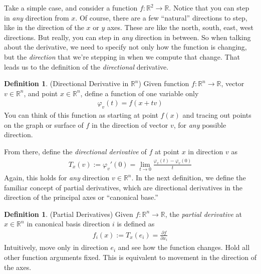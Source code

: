 \documentclass[12pt]{book}
\numberwithin{equation}{section} %
\theoremstyle{plain}
\theoremstyle{definition}
\newtheorem{defn}[thm]{Definition}
\theoremstyle{remark}
\newcommand{\R}{\mathbb{R}}
\newcommand{\Rn}{\mathbb{R}^n}
\begin{document}
Take a simple case, and consider a function $f:\R^2\rightarrow \R$.
Notice that you can step in \emph{any} direction from $x$. Of course,
there are a few ``natural'' directions to step, like in the direction of
the $x$ or $y$ axes. These are like the north, south, east, west
directions. But really, you can step in \emph{any} direction in between.
So when talking about the derivative, we need to specify not only how
the function is changing, but the \emph{direction} that we're stepping
in when we compute that change. That leads us to the definition of the
\emph{directional} derivative.
\begin{figure}[htpb!]
\centering
{}
\end{figure}

\begin{defn}{(Directional Derivative in $\Rn$)}
Given function $f:\Rn\rightarrow\R$, vector $v\in\Rn$, and point $x\in
\Rn$, define a function of one variable only
\begin{align*}
  \varphi_v(t) = f(x+tv)
\end{align*}
You can think of this function as starting at point $f(x)$ and tracing
out points on the graph or surface of $f$ in the direction of vector
$v$, for \emph{any} possible direction.

From there, define the \emph{directional derivative} of $f$ at point $x$
in direction $v$ as
\begin{align*}
  T_x(v) := \varphi_v'(0)
  = \lim_{t\rightarrow 0} \frac{\varphi_v(t)-\varphi_v(0)}{t}
\end{align*}
Again, this holds for \emph{any} direction $v\in\Rn$. In the next
definition, we define the familiar concept of partial derivatives, which
are directional derivatives in the direction of the principal axes or
``canonical base.''
\end{defn}

\begin{defn}{(Partial Derivatives)}
Given $f:\Rn\rightarrow\R$, the \emph{partial derivative} at $x\in\Rn$
in canonical basis direction $i$ is defined as
\begin{align*}
  f_i(x) := T_x(e_i) = \frac{\partial f}{\partial x_i}
\end{align*}
Intuitively, move only in direction $e_i$ and see how the function
changes. Hold all other function arguments fixed. This is equivalent to
movement in the direction of the axes.
\end{defn}
\end{document}
